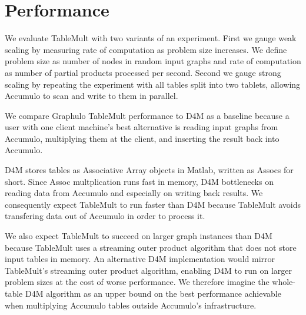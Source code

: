 
\section{Performance}
\label{sPerformance}

We evaluate TableMult with two variants of an experiment. 
First we gauge weak scaling by measuring rate of computation as problem size increases.
We define problem size as number of nodes in random input graphs
and rate of computation as number of partial products processed per second.
Second we gauge strong scaling by repeating the experiment with all tables split into two tablets,
allowing Accumulo to scan and write to them in parallel.



We compare Graphulo TableMult performance to D4M as a baseline because 
a user with one client machine's best alternative is reading input graphs from Accumulo, 
multiplying them at the client, and inserting the result back into Accumulo.

D4M stores tables as Associative Array objects in Matlab, written as Assocs for short.  
Since Assoc multplication runs fast in memory, 
D4M bottlenecks on reading data from Accumulo and especially on writing back results.
We consequently expect TableMult to run faster than D4M 
because TableMult avoids transfering data out of Accumulo in order to process it. 

We also expect TableMult to succeed on larger graph instances than D4M because TableMult
uses a streaming outer product algorithm that does not store input tables in memory.
An alternative D4M implementation would mirror TableMult's streaming outer product algorithm,
enabling D4M to run on larger problem sizes at the cost of worse performance.
We therefore imagine the whole-table D4M algorithm as an upper bound on the best performance 
achievable when multiplying Accumulo tables outside Accumulo's infrastructure.

